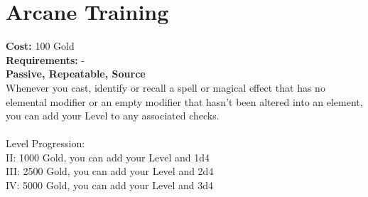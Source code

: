 \section*{Arcane Training}
\textbf{Cost:} 100 Gold\\
\textbf{Requirements:} -\\
\textbf{Passive, Repeatable, Source}\\
Whenever you cast, identify or recall a spell or magical effect that has no elemental modifier or an empty modifier that hasn't been altered into an element, you can add your Level to any associated checks.\\
\\
Level Progression:\\
II: 1000 Gold, you can add your Level and 1d4\\
III: 2500 Gold, you can add your Level and 2d4\\
IV: 5000 Gold, you can add your Level and 3d4\\
